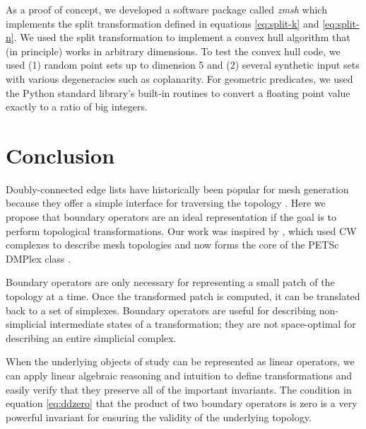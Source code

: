 \documentclass[twocolumn]{article}
\begin{document}
As a proof of concept, we developed a software package called \emph{zmsh}
which implements the split transformation defined in equations \eqref{eq:split-k} and \eqref{eq:split-n}.
We used the split transformation to implement a convex hull algorithm that (in principle) works in arbitrary dimensions.
To test the convex hull code, we used (1) random point sets up to dimension 5 and (2) several synthetic input sets with various degeneracies such as coplanarity.
For geometric predicates, we used the Python standard library's built-in routines to convert a floating point value exactly to a ratio of big integers.


\section{Conclusion}

Doubly-connected edge lists have historically been popular for mesh generation because they offer a simple interface for traversing the topology \cite{guibas1985primitives}.
Here we propose that boundary operators are an ideal representation if the goal is to perform topological transformations.
Our work was inspired by \cite{knepley2009mesh}, which used CW complexes to describe mesh topologies and now forms the core of the PETSc DMPlex class \cite{balay2019petsc}.

Boundary operators are only necessary for representing a small patch of the topology at a time.
Once the transformed patch is computed, it can be translated back to a set of simplexes.
Boundary operators are useful for describing non-simplicial intermediate states of a transformation; they are not space-optimal for describing an entire simplicial complex.

When the underlying objects of study can be represented as linear operators, we can apply linear algebraic reasoning and intuition to define transformations and easily verify that they preserve all of the important invariants.
The condition in equation \eqref{eq:ddzero} that the product of two boundary operators is zero is a very powerful invariant for ensuring the validity of the underlying topology.



\end{document}
